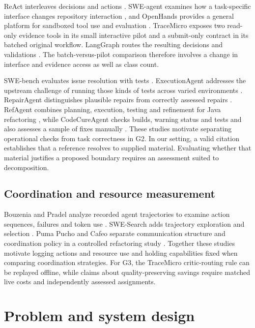 ReAct interleaves decisions and actions \cite{yao2023}. SWE-agent examines how a task-specific interface changes repository interaction \cite{sweagent}, and OpenHands provides a general platform for sandboxed tool use and evaluation \cite{openhh}. TraceMicro exposes two read-only evidence tools in its small interactive pilot and a submit-only contract in its batched original workflow. LangGraph routes the resulting decisions and validations \cite{langgraph}. The batch-versus-pilot comparison therefore involves a change in interface and evidence access as well as class count.

SWE-bench evaluates issue resolution with tests \cite{swebench}. ExecutionAgent addresses the upstream challenge of running those kinds of tests across varied environments \cite{execution}. RepairAgent distinguishes plausible repairs from correctly assessed repairs \cite{repairagent2025}. RefAgent combines planning, execution, testing and refinement for Java refactoring \cite{refagent}, while CodeCureAgent checks builds, warning status and tests and also assesses a sample of fixes manually \cite{codecure}. These studies motivate separating operational checks from task correctness in G2. In our setting, a valid citation establishes that a reference resolves to supplied material. Evaluating whether that material justifies a proposed boundary requires an assessment suited to decomposition.

\subsection{Coordination and resource measurement}

Bouzenia and Pradel analyze recorded agent trajectories to examine action sequences, failures and token use \cite{trajectories2025}. SWE-Search adds trajectory exploration and selection \cite{swesearch}. Puma Pucho and Cafeo separate communication structure and coordination policy in a controlled refactoring study \cite{puchocafeo2026}. Together these studies motivate logging actions and resource use and holding capabilities fixed when comparing coordination strategies. For G3, the TraceMicro critic-routing rule can be replayed offline, while claims about quality-preserving savings require matched live costs and independently assessed assignments.

\section{Problem and system design}

